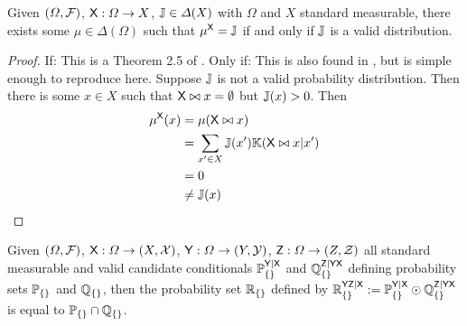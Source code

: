 \begin{theorem}[Validity]\label{th:completion}
Given $(\Omega,\mathcal{F})$, $\mathsf{X}:\Omega\to X$, $\mathbb{J}\in \Delta(X)$ with $\Omega$ and $X$ standard measurable, there exists some $\mu\in \Delta(\Omega)$ such that $\mu^{\mathsf{X}}=\mathbb{J}$ if and only if $\mathbb{J}$ is a valid distribution.
\end{theorem}

\begin{proof}
If:
This is a Theorem 2.5 of \citet{ershov_extension_1975}.
Only if:
This is also found in \citet{ershov_extension_1975}, but is simple enough to reproduce here. Suppose $\mathbb{J}$ is not a valid probability distribution. Then there is some $x\in X$ such that $\mathsf{X}\bowtie x = \emptyset$ but $\mathbb{J}(x)>0$. Then
\begin{align}
    \mu^{\mathsf{X}}(x) &= \mu (\mathsf{X}\bowtie x)\\
    &= \sum_{x'\in X} \mathbb{J}(x') \mathbb{K}(\mathsf{X}\bowtie x|x')\\
    &= 0\\
    &\neq \mathbb{J}(x)
\end{align}
\end{proof}


\begin{lemma}\label{th:intersection}
Given $(\Omega,\mathcal{F})$, $\mathsf{X}:\Omega\to (X,\mathcal{X})$, $\mathsf{Y}:\Omega\to (Y,\mathcal{Y})$, $\mathsf{Z}:\Omega\to (Z,\mathcal{Z})$ all standard measurable and valid candidate conditionals $\mathbb{P}_{\{\}}^{\mathsf{Y}|\mathsf{X}}$ and $\mathbb{Q}_{\{\}}^{\mathsf{Z}|\mathsf{YX}}$ defining probability sets $\mathbb{P}_{\{\}}$ and $\mathbb{Q}_{\{\}}$, then the probability set $\mathbb{R}_{\{\}}$ defined by $\mathbb{R}_{\{\}}^{\mathsf{YZ}|\mathsf{X}}:=\mathbb{P}_{\{\}}^{\mathsf{Y}|\mathsf{X}}\odot \mathbb{Q}_{\{\}}^{\mathsf{Z}|\mathsf{YX}}$ is equal to $\mathbb{P}_{\{\}}\cap\mathbb{Q}_{\{\}}$.
\end{lemma}

